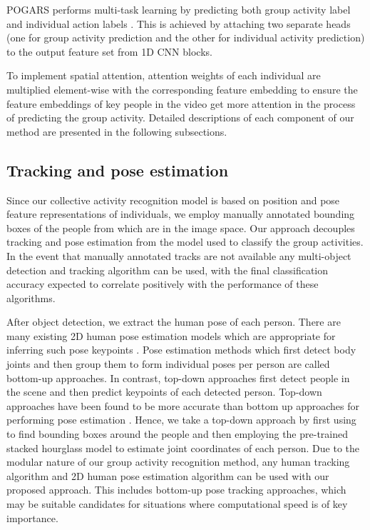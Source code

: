 \documentclass[a4paper,fleqn]{cas-dc}
\begin{document}
POGARS performs multi-task learning by predicting both group activity label  and individual action labels . 
This is achieved by attaching two separate heads (one for group activity prediction and the other for individual activity prediction) to the output feature set from 1D CNN blocks.

To implement spatial attention, attention weights of each individual are multiplied element-wise with the corresponding feature embedding to ensure the feature embeddings of key people in the video get more attention in the process of predicting the group activity. 
Detailed descriptions of each component of our method are presented in the following subsections.

\subsection{Tracking and pose estimation}
\label{ssec:tracking-pose-estimation}

Since our collective activity recognition model is based on position and pose feature representations of individuals, we employ manually annotated bounding boxes of the people from \cite{Sendo2019_HeatmappingOfPeople} which are in the image space. 
Our approach decouples tracking and pose estimation from the model used to classify the group activities. 
In the event that manually annotated tracks are not available any multi-object detection and tracking algorithm can be used, with the final classification accuracy expected to correlate positively with the performance of these algorithms.

After object detection, we extract the human pose of each person. 
There are many existing 2D human pose estimation models which are appropriate for inferring such pose keypoints \cite{Shotton2011_realtimePose,Cao2016_multiPersonPose,Newell2016_stackedHourGlass}. 
Pose estimation methods which first detect body joints and then group them to form individual poses per person are called bottom-up approaches. 
In contrast, top-down approaches first detect people in the scene and then predict keypoints of each detected person. 
Top-down approaches have been found to be more accurate than bottom up approaches for performing pose estimation \cite{He2017_mask-rcnn}. 
Hence, we take a top-down approach by first using \cite{Danelljan2014_robustVisTracking} to find bounding boxes around the people and then employing the pre-trained stacked hourglass model \cite{Newell2016_stackedHourGlass} to estimate joint coordinates of each person. 
Due to the modular nature of our group activity recognition method, any human tracking algorithm and 2D human pose estimation algorithm can be used with our proposed approach. 
This includes bottom-up pose tracking approaches, which may be suitable candidates for situations where computational speed is of key importance.
\end{document}
